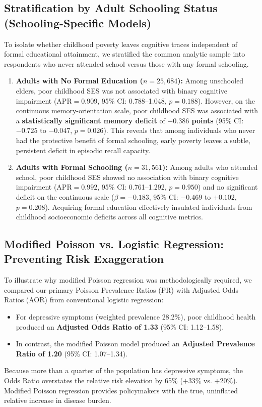 \subsection{Stratification by Adult Schooling Status (Schooling-Specific Models)}
To isolate whether childhood poverty leaves cognitive traces independent of formal educational attainment, we stratified the common analytic sample into respondents who never attended school versus those with any formal schooling.

\begin{enumerate}
    \item \textbf{Adults with No Formal Education ($n = 25{,}684$):} Among unschooled elders, poor childhood SES was not associated with binary cognitive impairment ($\text{APR} = 0.909$, 95\% CI: 0.788--1.048, $p = 0.188$). However, on the continuous memory-orientation scale, poor childhood SES was associated with a \textbf{statistically significant memory deficit} of \textbf{$-0.386$ points} (95\% CI: $-0.725$ to $-0.047$, $p = 0.026$). This reveals that among individuals who never had the protective benefit of formal schooling, early poverty leaves a subtle, persistent deficit in episodic recall capacity.
    \item \textbf{Adults with Formal Schooling ($n = 31{,}561$):} Among adults who attended school, poor childhood SES showed no association with binary cognitive impairment ($\text{APR} = 0.992$, 95\% CI: 0.761--1.292, $p = 0.950$) and no significant deficit on the continuous scale ($\beta = -0.183$, 95\% CI: $-0.469$ to $+0.102$, $p = 0.208$). Acquiring formal education effectively insulated individuals from childhood socioeconomic deficits across all cognitive metrics.
\end{enumerate}

\subsection{Modified Poisson vs. Logistic Regression: Preventing Risk Exaggeration}
To illustrate why modified Poisson regression was methodologically required, we compared our primary Poisson Prevalence Ratios (PR) with Adjusted Odds Ratios (AOR) from conventional logistic regression:
\begin{itemize}
    \item For depressive symptoms (weighted prevalence 28.2\%), poor childhood health produced an \textbf{Adjusted Odds Ratio of 1.33} (95\% CI: 1.12--1.58).
    \item In contrast, the modified Poisson model produced an \textbf{Adjusted Prevalence Ratio of 1.20} (95\% CI: 1.07--1.34).
\end{itemize}
Because more than a quarter of the population has depressive symptoms, the Odds Ratio overstates the relative risk elevation by 65\% ($+33\%$ vs. $+20\%$). Modified Poisson regression provides policymakers with the true, uninflated relative increase in disease burden.

